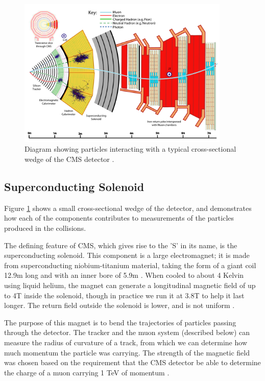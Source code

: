 \begin{figure}[htb]
\centering
\includegraphics[width=0.9\textwidth]{figures/cms-wedge.pdf}
\caption[Diagram showing particles interacting with a typical
cross-sectional wedge of the CMS detector.]{Diagram showing particles
  interacting with a typical cross-sectional wedge of the CMS detector
  \cite{particleflow}.}
\label{fig:cms:wedge}
\end{figure}

\subsection{Superconducting Solenoid}
\label{ssec:cms:components:magnet}

Figure \ref{fig:cms:wedge} shows a small cross-sectional wedge
of the detector, and demonstrates how each of the components
contributes to measurements of the particles produced in the
collisions.

The defining feature of CMS, which gives rise to the 'S' in its name,
is the superconducting solenoid. This component is a large
electromagnet; it is made from superconducting niobium-titanium
material, taking the form of a giant coil 12.9m long and with an inner
bore of 5.9m \cite{tdr}. When cooled to about 4 Kelvin using liquid helium,
the magnet can generate a longitudinal magnetic
field of up to 4T inside the solenoid, though in practice we run it at
3.8T to help it last longer. The return field outside the
solenoid is lower, and is not uniform \cite{accelexper}.

The purpose of this magnet is to bend the trajectories of particles
passing through the detector. The tracker and the muon system
(described below) can measure the radius of curvature of a track, from
which we can determine how much momentum the particle was
carrying. The strength of the magnetic field was chosen based on
the requirement that the CMS detector be able to determine the charge
of a muon carrying 1 TeV of momentum \cite{tdr}.

